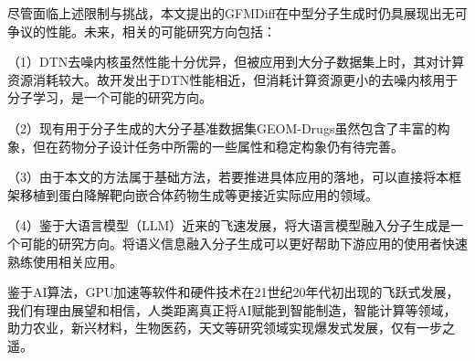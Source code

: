 尽管面临上述限制与挑战，本文提出的GFMDiff在中型分子生成时仍具展现出无可争议的性能。未来，相关的可能研究方向包括：

（1）DTN去噪内核虽然性能十分优异，但被应用到大分子数据集上时，其对计算资源消耗较大。故开发出于DTN性能相近，但消耗计算资源更小的去噪内核用于分子学习，是一个可能的研究方向。

（2）现有用于分子生成的大分子基准数据集GEOM-Drugs虽然包含了丰富的构象，但在药物分子设计任务中所需的一些属性和稳定构象仍有待完善。

（3）由于本文的方法属于基础方法，若要推进具体应用的落地，可以直接将本框架移植到蛋白降解靶向嵌合体药物生成等更接近实际应用的领域。

（4）鉴于大语言模型（LLM）近来的飞速发展，将大语言模型融入分子生成是一个可能的研究方向。将语义信息融入分子生成可以更好帮助下游应用的使用者快速熟练使用相关应用。

鉴于AI算法，GPU加速等软件和硬件技术在21世纪20年代初出现的飞跃式发展，我们有理由展望和相信，人类距离真正将AI赋能到智能制造，智能计算等领域，助力农业，新兴材料，生物医药，天文等研究领域实现爆发式发展，仅有一步之遥。